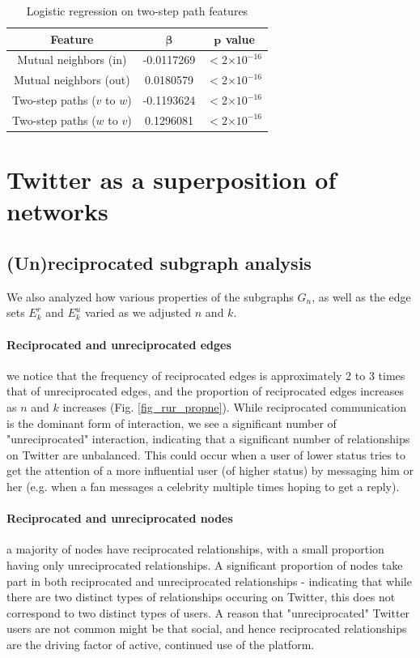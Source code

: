 \documentclass[conference]{IEEEtran}
\providecommand{\e}[1]{\ensuremath{\times 10^{#1}}}
\begin{document}
\begin{table}[!t]
\renewcommand{\arraystretch}{1.3}
\caption{Logistic regression on two-step path features}
\label{table_recresults_logrpath}
\centering
\begin{tabular}{|c||c|c|}
\hline
\bf{Feature} & $\mathbf{\beta}$ & $\mathbf{p}$ value \\
\hline
Mutual neighbors (in) & -0.0117269 & $< 2 \e{-16} $ \\
Mutual neighbors (out) & 0.0180579 & $< 2 \e{-16} $ \\
Two-step paths ($v$ to $w$) & -0.1193624 & $< 2 \e{-16} $ \\
Two-step paths ($w$ to $v$) & 0.1296081 & $< 2 \e{-16} $ \\
\hline
\end{tabular}
\end{table}

\section{Twitter as a superposition of networks}

\subsection{(Un)reciprocated subgraph analysis}
We also analyzed how various properties of the subgraphs $G_n$, as well as the edge sets $E^r_k$ and $E^u_k$ varied as we adjusted $n$ and $k$.

\paragraph{Reciprocated and unreciprocated edges} we notice that the frequency of reciprocated edges is approximately 2 to 3 times that of unreciprocated edges, and the proportion of reciprocated edges increases as $n$ and $k$ increases (Fig. \ref{fig_rur_propne}). While reciprocated communication is the dominant form of interaction, we see a significant number of "unreciprocated" interaction, indicating that a significant number of relationships on Twitter are unbalanced. This could occur when a user of lower status tries to get the attention of a more influential user (of higher status) by messaging him or her (e.g. when a fan messages a celebrity multiple times hoping to get a reply). 

\paragraph{Reciprocated and unreciprocated nodes} a majority of nodes have reciprocated relationships, with a small proportion having only unreciprocated relationships. A significant proportion of nodes take part in both reciprocated and unreciprocated relationships - indicating that while there are two distinct types of relationships occuring on Twitter, this does not correspond to two distinct types of users. A reason that "unreciprocated" Twitter users are not common might be that social, and hence reciprocated relationships are the driving factor of active, continued use of the platform. 
\end{document}
